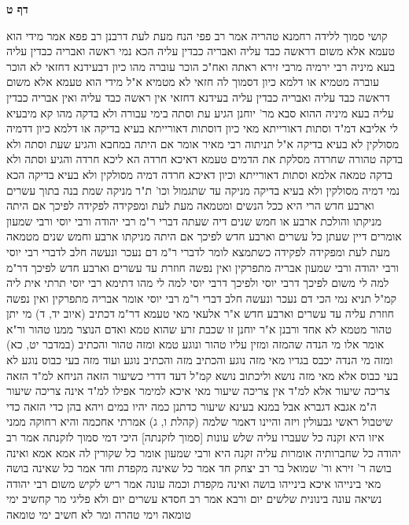 \documentclass[12pt, openany]{book}
\newcommand{\sethebfont}{
\fontsize{10.5pt}{21.0pt} \selectfont
}
\newcommand{\twocol}[1]{
	{\sethebfont \begin{multicols}{2}
			#1
	\end{multicols}}	
}
\newcommand{\sectname}{}
\newcommand{\newsection}[1]{
	\addcontentsline{toc}{section}{#1}
	\renewcommand{\sectname}{#1}	
	\vspace{-\baselineskip}
	\begin{center}
		\textbf{%
\fontsize{16pt}{16pt}\selectfont
			#1}
	\end{center}
	\vspace{-\baselineskip}
	\nopagebreak
}
\begin{document}
\newsection{דף ט}
\twocol{קושי סמוך ללידה רחמנא טהריה  אמר רב פפי  הנח מעת לעת דרבנן 
רב פפא אמר  מידי הוא טעמא אלא משום דראשה כבד עליה  ואבריה כבדין עליה הכא נמי ראשה ואבריה כבדין עליה 
בעא מיניה רבי ירמיה מרבי זירא  ראתה ואח"כ הוכר עוברה מהו  כיון דבעידנא דחזאי לא הוכר עוברה מטמיא או דלמא  כיון דסמוך לה חזאי לא מטמיא 
א"ל  מידי הוא טעמא אלא משום דראשה כבד עליה ואבריה כבדין עליה בעידנא דחזאי אין ראשה כבד עליה ואין אבריה כבדין עליה 
בעא מיניה ההוא סבא מר' יוחנן  הגיע עת וסתה בימי עבורה ולא בדקה מהו  קא מיבעיא לי אליבא דמ"ד וסתות דאורייתא  מאי כיון דוסתות דאורייתא בעיא בדיקה או דלמא  כיון דדמיה מסולקין לא בעיא בדיקה 
א"ל תניתוה  רבי מאיר אומר אם היתה במחבא והגיע שעת וסתה ולא בדקה טהורה שחרדה מסלקת את הדמים  טעמא דאיכא חרדה הא ליכא חרדה והגיע וסתה ולא בדקה טמאה
אלמא  וסתות דאורייתא  וכיון דאיכא חרדה דמיה מסולקין ולא בעיא בדיקה  הכא נמי דמיה מסולקין ולא בעיא בדיקה
מניקה עד שתגמול וכו' ת"ר  מניקה שמת בנה בתוך עשרים וארבע חדש הרי היא ככל הנשים ומטמאה מעת לעת ומפקידה לפקידה  לפיכך אם היתה מניקתו והולכת ארבע או חמש שנים דיה שעתה דברי ר"מ 
רבי יהודה ורבי יוסי ורבי שמעון אומרים  דיין שעתן כל עשרים וארבע חדש לפיכך אם היתה מניקתו ארבע וחמש שנים מטמאה מעת לעת ומפקידה לפקידה 
כשתמצא לומר לדברי ר"מ דם נעכר ונעשה חלב לדברי רבי יוסי ורבי יהודה ורבי שמעון אבריה מתפרקין ואין נפשה חוזרת עד עשרים וארבע חדש 
לפיכך דר"מ למה לי  משום לפיכך דרבי יוסי 
ולפיכך דרבי יוסי למה לי  מהו דתימא  רבי יוסי תרתי אית ליה קמ"ל 
תניא נמי הכי  דם נעכר ונעשה חלב דברי ר"מ  רבי יוסי אומר  אבריה מתפרקין ואין נפשה חוזרת עליה עד עשרים וארבע חדש  א"ר אלעאי  מאי טעמא דר"מ דכתיב  (איוב יד, ד) מי יתן טהור מטמא לא אחד 
ורבנן א"ר יוחנן  זו שכבת זרע שהוא טמא ואדם הנוצר ממנו טהור 
ור"א אומר  אלו מי הנדה שהמזה ומזין עליו טהור ונוגע טמא  ומזה טהור  והכתיב  (במדבר יט, כא) ומזה מי הנדה יכבס בגדיו  מאי מזה נוגע 
והכתיב מזה והכתיב נוגע  ועוד מזה בעי כבוס נוגע לא בעי כבוס  אלא  מאי מזה נושא 
וליכתוב נושא  קמ"ל דעד דדרי כשיעור הזאה  הניחא למ"ד הזאה צריכה שיעור אלא למ"ד אין צריכה שיעור מאי איכא למימר 
אפילו למ"ד אינה צריכה שיעור ה"מ אגבא דגברא אבל במנא בעינא שיעור  כדתנן  כמה יהיו במים ויהא בהן כדי הזאה  כדי שיטבול ראשי גבעולין ויזה 
והיינו דאמר שלמה  (קהלת ו, ג) אמרתי אחכמה והיא רחוקה ממני
איזו היא זקנה כל שעברו עליה שלש עונות [סמוך לזקנתה] היכי דמי סמוך לזקנתה  אמר רב יהודה  כל שחברותיה אומרות עליה זקנה היא  ורבי שמעון אומר
כל שקורין לה אמא אמא ואינה בושה  ר' זירא ור' שמואל בר רב יצחק חד אמר  כל שאינה מקפדת וחד אמר  כל שאינה בושה   מאי בינייהו  איכא בינייהו  בושה ואינה מקפדת 
וכמה עונה  אמר ריש לקיש משום רבי יהודה נשיאה  עונה בינונית שלשים יום  ורבא אמר רב חסדא  עשרים יום  ולא פליגי מר קחשיב ימי טומאה וימי טהרה ומר לא חשיב ימי טומאה 
}
\end{document}
